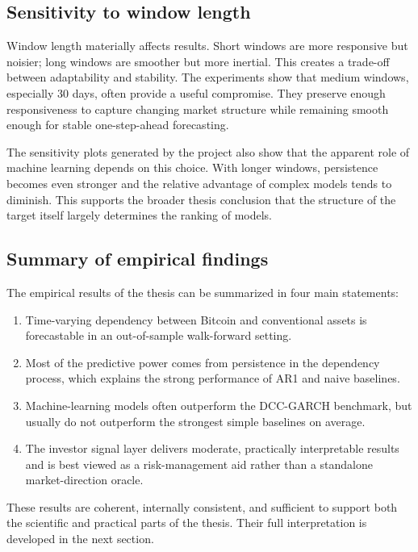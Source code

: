 \subsection{Sensitivity to window length}

Window length materially affects results. Short windows are more responsive but noisier; long windows are smoother but more inertial. This creates a trade-off between adaptability and stability. The experiments show that medium windows, especially 30 days, often provide a useful compromise. They preserve enough responsiveness to capture changing market structure while remaining smooth enough for stable one-step-ahead forecasting.

The sensitivity plots generated by the project also show that the apparent role of machine learning depends on this choice. With longer windows, persistence becomes even stronger and the relative advantage of complex models tends to diminish. This supports the broader thesis conclusion that the structure of the target itself largely determines the ranking of models.

\subsection{Summary of empirical findings}

The empirical results of the thesis can be summarized in four main statements:

\begin{enumerate}
    \item Time-varying dependency between Bitcoin and conventional assets is forecastable in an out-of-sample walk-forward setting.
    \item Most of the predictive power comes from persistence in the dependency process, which explains the strong performance of AR1 and naive baselines.
    \item Machine-learning models often outperform the DCC-GARCH benchmark, but usually do not outperform the strongest simple baselines on average.
    \item The investor signal layer delivers moderate, practically interpretable results and is best viewed as a risk-management aid rather than a standalone market-direction oracle.
\end{enumerate}

These results are coherent, internally consistent, and sufficient to support both the scientific and practical parts of the thesis. Their full interpretation is developed in the next section.
